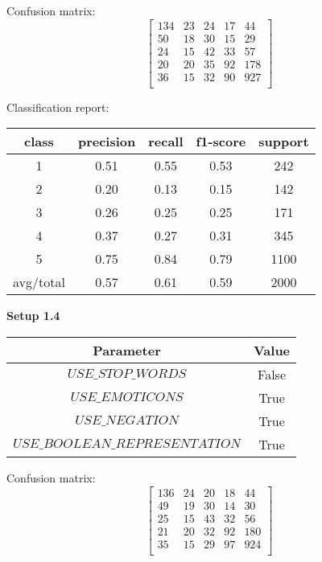 \documentclass[12pt]{report}
\begin{document}
Confusion matrix:
\[
\begin{bmatrix}
134 & 23 & 24 & 17 & 44 \\
50 & 18 & 30 & 15 & 29 \\
24 & 15 & 42 & 33 & 57 \\
20 & 20 & 35 & 92 & 178 \\
36 & 15 & 32 & 90 & 927 \\
\end{bmatrix}
\]

Classification report:

\begin{center}
	\begin{tabular}{c | c | c | c | c }
		\hline
		class & precision & recall & f1-score & support \\ \hline
		1 & 0.51 & 0.55 & 0.53 & 242 \\ \hline
		2 & 0.20 & 0.13 & 0.15 & 142 \\ \hline
		3 & 0.26 & 0.25 & 0.25 & 171 \\ \hline
		4 & 0.37 & 0.27 & 0.31 & 345 \\ \hline
		5 & 0.75 & 0.84 & 0.79 & 1100 \\ \hline
		avg/total & 0.57 & 0.61 & 0.59 & 2000 \\ \hline
	\end{tabular}
\end{center}


\textbf{Setup 1.4}

\begin{center}
	\begin{tabular}{ c | c }
		\hline
		Parameter & Value \\ \hline
		$USE\_STOP\_WORDS$ & False \\ \hline
		$USE\_EMOTICONS$ & True \\ \hline
		$USE\_NEGATION$ & True \\ \hline
		$USE\_BOOLEAN\_REPRESENTATION$ & True \\ \hline
	\end{tabular}
\end{center}

Confusion matrix:
\[
\begin{bmatrix}
136 & 24 & 20 & 18 & 44 \\
49 & 19 & 30 & 14 & 30 \\
25 & 15 & 43 & 32 & 56 \\
21 & 20 & 32 & 92 & 180 \\
35 & 15 & 29 & 97 & 924 \\
\end{bmatrix}
\]
\end{document}
